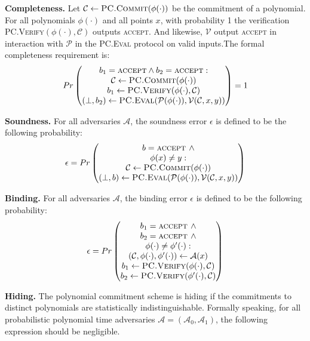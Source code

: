 \textbf{Completeness.} Let $\mathcal{C} \leftarrow \textsc{PC.Commit}(\phi(\cdot))$ be the commitment of a polynomial. 
For all polynomials $\phi(\cdot)$ and all points $x$, with probability 1 the verification \textsc{PC.Verify}$(\phi(\cdot), \mathcal{C})$ outputs \textsc{accept}. And likewise, $\mathcal{V}$ output \textsc{accept} in interaction with $\mathcal{P}$ in the \textsc{PC.Eval} protocol on valid inputs.The formal completeness requirement is:
$$
Pr
\begin{pmatrix}
 b_1 = \textsc{accept} \wedge b_2 = \textsc{accept}: \\
 \mathcal{C} \leftarrow \textsc{PC.Commit}(\phi(\cdot)) \\
 b_1 \leftarrow \textsc{PC.Verify}(\phi(\cdot), \mathcal{C}) \\
 (\perp, b_2)\leftarrow \textsc{PC.Eval}(\mathcal{P}(\phi(\cdot)), \mathcal{V}(\mathcal{C}, x, y))
\end{pmatrix}
= 1
$$



\textbf{Soundness.} For all adversaries $\mathcal{A}$, the soundness error $\epsilon$ is defined to be the following probability:
$$
\epsilon = Pr
\begin{pmatrix}
 b = \textsc{accept } \wedge \\
 \phi(x) \neq y: \\
 \mathcal{C} \leftarrow \textsc{PC.Commit}(\phi(\cdot)) \\
 (\perp, b)\leftarrow \textsc{PC.Eval}(\mathcal{P}(\phi(\cdot)), \mathcal{V}(\mathcal{C}, x, y))
\end{pmatrix}
$$


\textbf{Binding.} For all adversaries $\mathcal{A}$, the binding error $\epsilon$ is defined to be the following probability:
$$
\epsilon = Pr
\begin{pmatrix}
 b_1 = \textsc{accept } \wedge \\
 b_2 = \textsc{accept } \wedge \\
 \phi(\cdot) \neq \phi^\prime(\cdot): \\
 (\mathcal{C}, \phi(\cdot), \phi^\prime(\cdot)) \leftarrow \mathcal{A}(x) \\
 b_1 \leftarrow \textsc{PC.Verify}(\phi(\cdot), \mathcal{C}) \\
 b_2 \leftarrow \textsc{PC.Verify}(\phi^\prime(\cdot), \mathcal{C})
\end{pmatrix}
$$



\textbf{Hiding.} The polynomial commitment scheme is hiding if the commitments to distinct polynomials are statistically indistinguishable. Formally speaking, for all probabilistic polynomial time adversaries $\mathcal{A} = (\mathcal{A}_0, \mathcal{A}_1)$, the following expression should be negligible.

